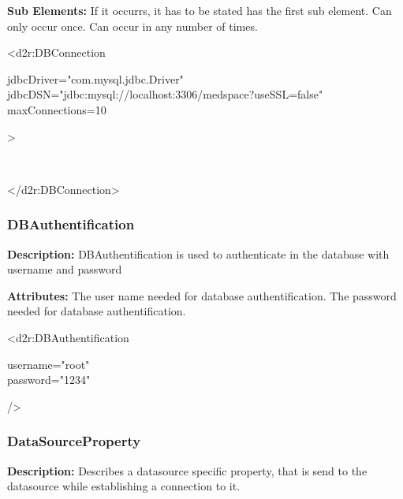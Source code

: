 \textbf{Sub Elements:} \newline
{}
If it occurrs, it has to be stated has the first sub element.
Can only occur once.
\EndAttribute
{}
Can occur in any number of times.
\EndAttribute

\begin{ExampleBox}
	<d2r:DBConnection
	\begin{indention}{1cm}
		jdbcDriver="com.mysql.jdbc.Driver"\\
		jdbcDSN="jdbc:mysql://localhost:3306/medspace?useSSL=false"\\
		maxConnections=10
	\end{indention}
	>
		\begin{indention}{1cm}
		\\
		\end{indention}
	</d2r:DBConnection>
\end{ExampleBox}

\subsubsection{DBAuthentification}
\textbf{Description:} \newline
DBAuthentification is used to authenticate in the database with username and password

\textbf{Attributes:} \newline
{}
The user name needed for database authentification.
\EndAttribute
{}
The password needed for database authentification.
\EndAttribute

\begin{ExampleBox}
	<d2r:DBAuthentification
	\begin{indention}{1cm}
		username="root"\\
		password="1234"	
	\end{indention}
	/>
\end{ExampleBox}

\subsubsection{DataSourceProperty}
\textbf{Description:} \newline
Describes a datasource specific property, that is send to the datasource while establishing a connection to it.

